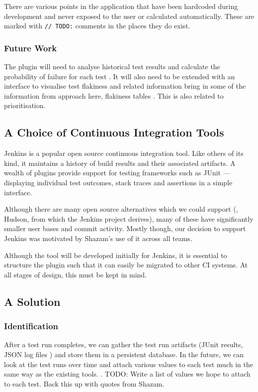 There are various points in the application that have been hardcoded during development and never exposed to the user or calculated automatically. These are marked with \texttt{// TODO:} comments in the places they do exist.

\subsubsection{Future Work}

The plugin will need to analyse historical test results and calculate the probability of failure for each test . It will also need to be extended with an interface to visualise test flakiness and related information {\todo bring in some of the information from approach here, flakiness tables \etc}. This is also related to prioritisation.


\subsection{A Choice of Continuous Integration Tools}

Jenkins \cite{Jenkins} is a popular open source continuous integration tool. Like others of its kind, it maintains a history of build results and their associated artifacts. A wealth of plugins provide support for testing frameworks such as JUnit --- displaying individual test outcomes, stack traces and assertions in a simple interface.

Although there are many open source alternatives which we could support (\eg, Hudson, from which the Jenkins project derives), many of these have significantly smaller user bases and commit activity. Mostly though, our decision to support Jenkins was motivated by Shazam's use of it across all teams.

Although the tool will be developed initially for Jenkins, it is essential to structure the plugin such that it can easily be migrated to other CI systems. At all stages of design, this must be kept in mind.


\subsection{A Solution}

\subsubsection{Identification}

After a test run completes, we can gather the test run artifacts (JUnit results, \heisentest{} JSON log files \etc) and store them in a persistent database. In the future, we can look at the test runs over time and attach various values to each test much in the same way as the existing tools. .
TODO: Write a list of values we hope to attach to each test. Back this up with quotes from Shazam.

